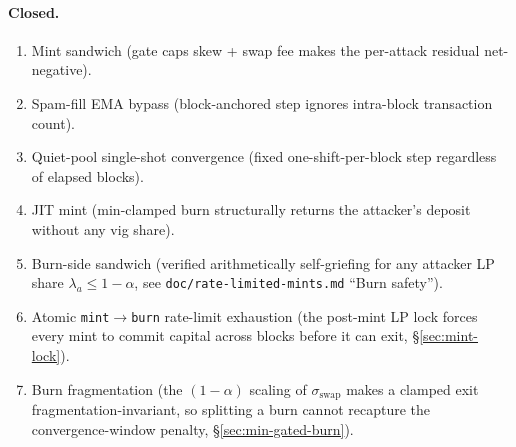 \documentclass[11pt]{article}
\begin{document}
\paragraph{Closed.}
\begin{enumerate}
  \item Mint sandwich (gate caps skew + swap fee makes the per-attack
        residual net-negative).
  \item Spam-fill EMA bypass (block-anchored step ignores intra-block
        transaction count).
  \item Quiet-pool single-shot convergence (fixed one-shift-per-block
        step regardless of elapsed blocks).
  \item JIT mint (min-clamped burn structurally returns the attacker's
        deposit without any vig share).
  \item Burn-side sandwich (verified arithmetically self-griefing for
        any attacker LP share $\lambda_a \le 1 - \alpha$, see
        \texttt{doc/rate-limited-mints.md} ``Burn safety'').
  \item Atomic \texttt{mint}$\to$\texttt{burn} rate-limit exhaustion
        (the post-mint LP lock forces every mint to commit capital
        across blocks before it can exit, \S\ref{sec:mint-lock}).
  \item Burn fragmentation (the $(1-\alpha)$ scaling of
        $\sigma_{\mathrm{swap}}$ makes a clamped exit
        fragmentation-invariant, so splitting a burn cannot recapture
        the convergence-window penalty, \S\ref{sec:min-gated-burn}).
\end{enumerate}
\end{document}
